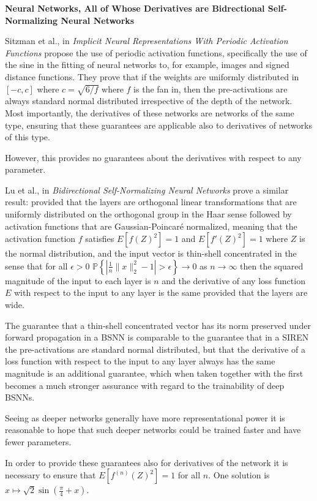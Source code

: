 \documentclass{letter}
\begin{document}
{\bf Neural Networks, All of Whose Derivatives are Bidrectional Self-Normalizing Neural Networks}

Sitzman et al., in {\it Implicit Neural Representations With Periodic Activation Functions} propose the use of periodic activation functions, specifically the use of the sine in the fitting of neural networks to, for example, images and signed distance functions. They prove that if the weights are uniformly distributed in $[-c,c]$ where $c=\sqrt{6/f}$ where $f$ is the fan in, then the pre-activations are always standard normal distributed irrespective of the depth of the network. Most importantly, the derivatives of these networks are networks of the same type, ensuring that these guarantees are applicable also to derivatives of networks of this type.

However, this provides no guarantees about the derivatives with respect to any parameter.

Lu et al., in {\it Bidirectional Self-Normalizing Neural Networks} prove a similar result: provided that the layers are orthogonal linear transformations that are uniformly distributed on the orthogonal group in the Haar sense followed by activation functions that are Gaussian-Poincaré normalized, meaning that the activation function $f$ satisfies $E[f(Z)^2]=1$ and $E[f'(Z)^2]=1$ where $Z$ is the normal distribution, and the input vector is thin-shell concentrated in the sense that for all $\epsilon>0$ $\mathbb{P}\left\{|\frac{1}{n}\|x\|_2^2-1|>\epsilon\right\}\rightarrow 0$ as $n\rightarrow \infty$ then the squared magnitude of the input to each layer is $n$ and the derivative of any loss function $E$ with respect to the input to any layer is the same provided that the layers are wide.

The guarantee that a thin-shell concentrated vector has its norm preserved under forward propagation in a BSNN is comparable to the guarantee that in a SIREN the pre-activations are standard normal distributed, but that the derivative of a loss function with respect to the input to any layer always has the same magnitude is an additional guarantee, which when taken together with the first becomes a much stronger assurance with regard to the trainability of deep BSNNs.

Seeing as deeper networks generally have more representational power it is reasonable to hope that such deeper networks could be trained faster and have fewer parameters.

In order to provide these guarantees also for derivatives of the network it is necessary to ensure that $E[f^{(n)}(Z)^2]=1$ for all $n$. One solution is $x\mapsto \sqrt{2}\sin(\frac{\pi}{4}+x)$.
\end{document}
